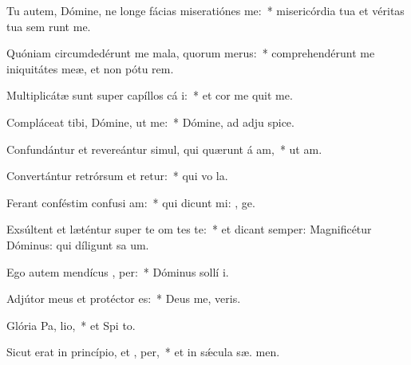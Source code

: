 \item Tu autem, Dómine, ne longe fácias miseratiónes   me:~* misericórdia tua et véritas tua sem runt me.
\item Quóniam circumdedérunt me mala, quorum   merus:~* comprehendérunt me iniquitátes meæ, et non pótu  rem.
\item Multiplicátæ sunt super capíllos cá i:~* et cor me quit me.
\item Compláceat tibi, Dómine, ut  me:~* Dómine, ad adju  spice.
\item Confundántur et revereántur simul, qui quærunt á am,~* ut  am.
\item Convertántur retrórsum et retur:~* qui vo  la.
\item Ferant conféstim confusi am:~* qui dicunt mi: , ge.
\item Exsúltent et læténtur super te om tes te:~* et dicant semper: Magnificétur Dóminus: qui díligunt sa um.
\item Ego autem mendícus ,  per:~* Dóminus sollí  i.
\item Adjútor meus et protéctor   es:~* Deus me,  veris.
\item Glória Pa,  lio,~* et Spi to.
\item Sicut erat in princípio, et ,  per,~* et in sǽcula sæ. men.
